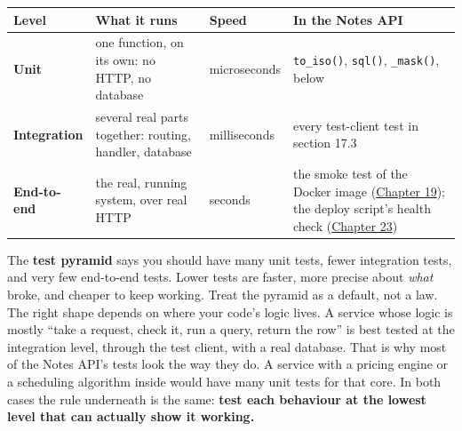 {\def\LTcaptype{none} %
\begin{longtable}[]{@{}
  >{\raggedright\arraybackslash}p{}
  >{\raggedright\arraybackslash}p{}
  >{\raggedright\arraybackslash}p{}
  >{\raggedright\arraybackslash}p{}@{}}
\toprule\noalign{}
\begin{minipage}[b]{\linewidth}\raggedright
Level
\end{minipage} & \begin{minipage}[b]{\linewidth}\raggedright
What it runs
\end{minipage} & \begin{minipage}[b]{\linewidth}\raggedright
Speed
\end{minipage} & \begin{minipage}[b]{\linewidth}\raggedright
In the Notes API
\end{minipage} \\
\midrule\noalign{}
\endhead
\bottomrule\noalign{}
\endlastfoot
\textbf{Unit} & one function, on its own: no HTTP, no database & microseconds & \texttt{to\_iso()}, \texttt{sql()}, \texttt{\_mask()}, below \\
\textbf{Integration} & several real parts together: routing, handler, database & milliseconds & every test-client test in section 17.3 \\
\textbf{End-to-end} & the real, running system, over real HTTP & seconds & the smoke test of the Docker image (\hyperref[ch:19-artifact-storage]{Chapter 19}); the deploy script's health check (\hyperref[ch:23-code-transfer]{Chapter 23}) \\
\end{longtable}
}

The \textbf{test pyramid} says you should have many unit tests, fewer integration tests, and very few end-to-end tests. Lower tests are faster, more precise about \emph{what} broke, and cheaper to keep working. Treat the pyramid as a default, not a law. The right shape depends on where your code's logic lives. A service whose logic is mostly ``take a request, check it, run a query, return the row'' is best tested at the integration level, through the test client, with a real database. That is why most of the Notes API's tests look the way they do. A service with a pricing engine or a scheduling algorithm inside would have many unit tests for that core. In both cases the rule underneath is the same: \textbf{test each behaviour at the lowest level that can actually show it working.}

